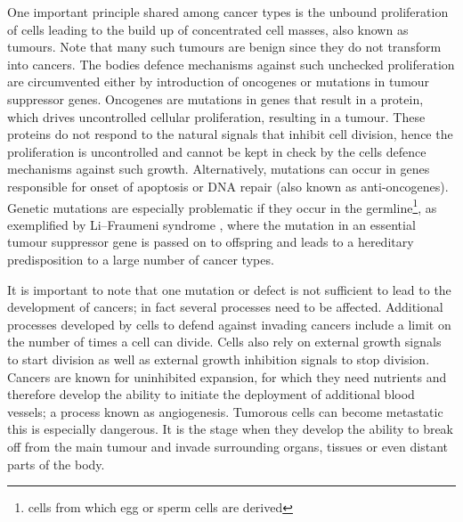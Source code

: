 One important principle shared among cancer types is the unbound proliferation of cells leading to the build up of concentrated cell masses, also known as tumours. Note that many such tumours are benign since they do not transform into cancers. The bodies defence mechanisms against such unchecked proliferation are circumvented either by introduction of oncogenes or mutations in tumour suppressor genes. Oncogenes are mutations in genes that result in a protein, which drives uncontrolled cellular proliferation, resulting in a tumour. These proteins do not respond to the natural signals that inhibit cell division, hence the proliferation is uncontrolled and cannot be kept in check by the cells defence mechanisms against such growth. Alternatively, mutations can occur in genes responsible for onset of apoptosis or DNA repair (also known as anti-oncogenes). Genetic mutations are especially problematic if they occur in the germline\footnote{cells from which egg or sperm cells are derived}, as exemplified by Li–Fraumeni syndrome \citep{Li:1969kl}, where the mutation in an essential tumour suppressor gene is passed on to offspring and leads to a hereditary predisposition to a large number of cancer types.

It is important to note that one mutation or defect is not sufficient to lead to the development of cancers; in fact several processes need to be affected. Additional processes developed by cells to defend against invading cancers include a limit on the number of times a cell can divide. Cells also rely on external growth signals to start division as well as external growth inhibition signals to stop division. Cancers are known for uninhibited expansion, for which they need nutrients and therefore develop the ability to initiate the deployment of additional blood vessels; a process known as angiogenesis. Tumorous cells can become metastatic this is especially dangerous. It is the stage when they develop the ability to break off from the main tumour and invade surrounding organs, tissues or even distant parts of the body.

